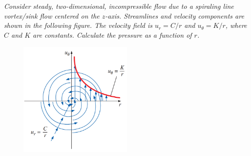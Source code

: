 \section{}
\textit{Consider steady, two-dimensional, incompressible flow due to a spiraling line vortex/sink flow centered on the $z$-axis. Streamlines and velocity components are shown in the following figure. The velocity field is $u_r = C/r$ and $u_{\theta} = K/r$, where $C$ and $K$ are constants. Calculate the pressure as a function of $r$.}

\begin{figure}[h]
    \centering
    \includegraphics[width=0.5\textwidth]{Questions/Figures/Q1 Problem Diagram.png}
\end{figure}

